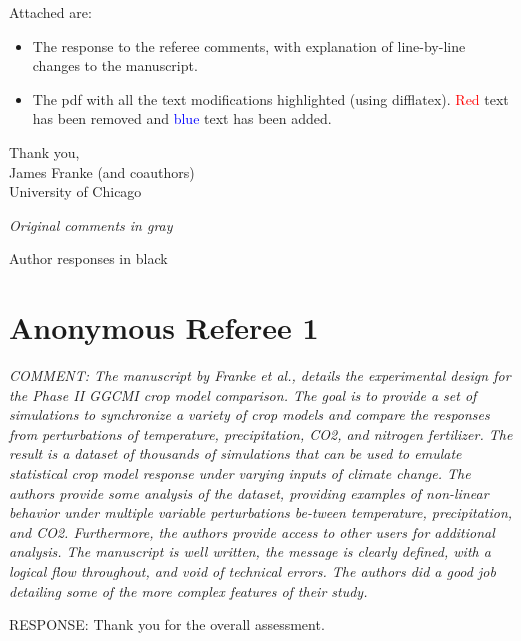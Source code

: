 \documentclass[gmd, manuscript]{copernicus} %
\begin{document}
Attached are:
\begin{itemize}
\item The response to the referee comments, with explanation of line-by-line changes to the manuscript.
\item The pdf with all the text modifications highlighted (using difflatex). \textcolor{red}{Red} text has been removed and \textcolor{blue}{blue} text has been added.  
\end{itemize}

\bigskip

\begin{flushright}
\noindent Thank you,\\
James Franke (and coauthors)\\
University of Chicago\\
\end{flushright}

\bigskip
\bigskip

\noindent \textcolor{dark-gray}{\textit{Original comments in gray}}

\smallskip

\noindent Author responses in black


\clearpage
\section{Anonymous Referee 1}

\textcolor{dark-gray}{\textit{COMMENT: The manuscript by Franke et al., details the experimental design for the Phase II GGCMI crop model comparison. The goal is to provide a set of simulations to synchronize a variety of crop models and compare the responses from perturbations of temperature, precipitation, CO2, and nitrogen fertilizer. The result is a dataset of thousands of simulations that can be used to emulate statistical crop model response under varying inputs of climate change. The authors provide some analysis of the dataset, providing examples of non-linear behavior under multiple variable perturbations be-tween temperature, precipitation, and CO2. Furthermore, the authors provide access to other users for additional analysis. The manuscript is well written, the message is clearly defined, with a logical flow throughout, and void of technical errors. The authors did a good job detailing some of the more complex features of their study.}} 

RESPONSE: Thank you for the overall assessment.
\smallskip
\end{document}
